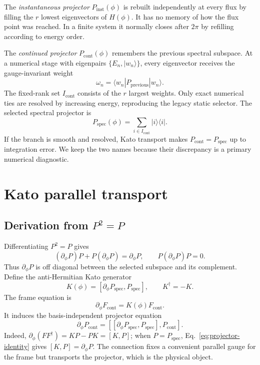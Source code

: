 \documentclass[aps,prb,twocolumn,floatfix,nofootinbib,superscriptaddress]{revtex4-2}
\begin{document}
The \emph{instantaneous projector} $P_{\mathrm{inst}}(\phi)$ is rebuilt
independently at every flux by filling the $r$ lowest eigenvectors of
$H(\phi)$.  It has no memory of how the flux point was reached.  In a finite
system it normally closes after $2\pi$ by refilling according to energy order.

The \emph{continued projector} $P_{\mathrm{cont}}(\phi)$ remembers the
previous spectral subspace.  At a numerical stage with eigenpairs
$\{E_n,|w_n\rangle\}$, every eigenvector receives the gauge-invariant weight
\begin{equation}
  \omega_n=\langle w_n|P_{\mathrm{previous}}|w_n\rangle.
  \label{eq:weights}
\end{equation}
The fixed-rank set $I_{\mathrm{cont}}$ consists of the $r$ largest weights.
Only exact numerical ties are resolved by increasing energy, reproducing the
legacy static selector.  The selected spectral projector is
\begin{equation}
  P_{\mathrm{spec}}(\phi)=
  \sum_{i\in I_{\mathrm{cont}}}|i\rangle\langle i|.
  \label{eq:pspec}
\end{equation}
If the branch is smooth and resolved, Kato transport makes
$P_{\mathrm{cont}}=P_{\mathrm{spec}}$ up to integration error.  We keep the
two names because their discrepancy is a primary numerical diagnostic.

\section{Kato parallel transport}

\subsection{Derivation from $P^2=P$}

Differentiating $P^2=P$ gives
\begin{equation}
  (\partial_\phi P)P+P(\partial_\phi P)=\partial_\phi P,
  \qquad P(\partial_\phi P)P=0.
  \label{eq:projector-identity}
\end{equation}
Thus $\partial_\phi P$ is off diagonal between the selected subspace and its
complement.  Define the anti-Hermitian Kato generator
\begin{equation}
  K(\phi)=[\partial_\phi P_{\mathrm{spec}},P_{\mathrm{spec}}],
  \qquad K^\dagger=-K.
  \label{eq:kato-generator}
\end{equation}
The frame equation is
\begin{equation}
  \partial_\phi F_{\mathrm{cont}}=K(\phi)F_{\mathrm{cont}}.
  \label{eq:frame-kato}
\end{equation}
It induces the basis-independent projector equation
\begin{equation}
  \partial_\phi P_{\mathrm{cont}}
  =[[\partial_\phi P_{\mathrm{spec}},P_{\mathrm{spec}}],
  P_{\mathrm{cont}}].
  \label{eq:projector-kato}
\end{equation}
Indeed, $\partial_\phi(FF^\dagger)=KP-PK=[K,P]$; when
$P=P_{\mathrm{spec}}$, Eq.~\eqref{eq:projector-identity} gives
$[K,P]=\partial_\phi P$.  The connection fixes a convenient parallel gauge
for the frame but transports the projector, which is the physical object.
\end{document}
